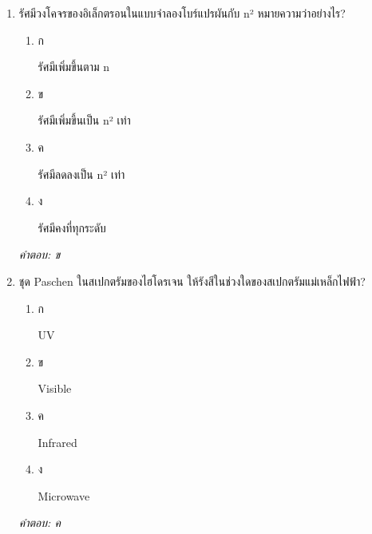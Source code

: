 \documentclass[12pt]{article}
\begin{document}
\begin{enumerate}[label=\arabic*., itemsep=0.5\baselineskip, topsep=0.5\baselineskip, leftmargin=*]
\item รัศมีวงโคจรของอิเล็กตรอนในแบบจำลองโบร์แปรผันกับ n² หมายความว่าอย่างไร?
\begin{enumerate}[label=\alph*)., itemsep=0.3\baselineskip, topsep=0.3\baselineskip]
\item ก\ 
\begin{minipage}[t]{0.9\linewidth}
\raggedright รัศมีเพิ่มขึ้นตาม n
\end{minipage}
\item ข\ 
\begin{minipage}[t]{0.9\linewidth}
\raggedright รัศมีเพิ่มขึ้นเป็น n² เท่า
\end{minipage}
\item ค\ 
\begin{minipage}[t]{0.9\linewidth}
\raggedright รัศมีลดลงเป็น n² เท่า
\end{minipage}
\item ง\ 
\begin{minipage}[t]{0.9\linewidth}
\raggedright รัศมีคงที่ทุกระดับ
\end{minipage}
\end{enumerate}
\vspace{-0.3\baselineskip}
\begin{small}
\textit{คำตอบ: ข}
\end{small}

\item ชุด Paschen ในสเปกตรัมของไฮโดรเจน ให้รังสีในช่วงใดของสเปกตรัมแม่เหล็กไฟฟ้า?
\begin{enumerate}[label=\alph*)., itemsep=0.3\baselineskip, topsep=0.3\baselineskip]
\item ก\ 
\begin{minipage}[t]{0.9\linewidth}
\raggedright UV
\end{minipage}
\item ข\ 
\begin{minipage}[t]{0.9\linewidth}
\raggedright Visible
\end{minipage}
\item ค\ 
\begin{minipage}[t]{0.9\linewidth}
\raggedright Infrared
\end{minipage}
\item ง\ 
\begin{minipage}[t]{0.9\linewidth}
\raggedright Microwave
\end{minipage}
\end{enumerate}
\vspace{-0.3\baselineskip}
\begin{small}
\textit{คำตอบ: ค}
\end{small}


\end{enumerate}
\end{document}
